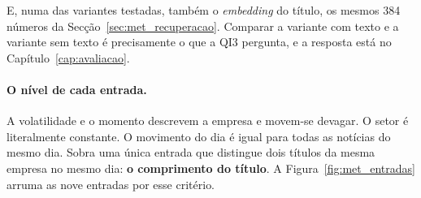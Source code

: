 E, numa das variantes testadas, também o \emph{embedding} do título, os mesmos 384 números da
Secção~\ref{sec:met_recuperacao}. Comparar a variante com texto e a variante sem texto é
precisamente o que a \gls{QI}3 pergunta, e a resposta está no Capítulo~\ref{cap:avaliacao}.

\paragraph{O nível de cada entrada.}
A volatilidade e o momento descrevem a
empresa e movem-se devagar. O setor é literalmente constante. O movimento do dia é igual para
todas as notícias do mesmo dia. Sobra uma única entrada que distingue dois títulos da mesma
empresa no mesmo dia: \textbf{o comprimento do título}. A Figura~\ref{fig:met_entradas} arruma as nove
entradas por esse critério.

